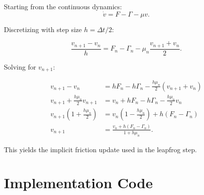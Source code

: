 \documentclass[12pt,letterpaper,twoside]{article}
\begin{document}
Starting from the continuous dynamics:
\[
\dot{v} = F - \Gamma - \mu v.
\]

Discretizing with step size $h = \Delta t / 2$:

\[
\frac{v_{n+1} - v_n}{h} = F_n - \Gamma_n - \mu_n \frac{v_{n+1} + v_n}{2}.
\]

Solving for $v_{n+1}$:

\begin{align}
v_{n+1} - v_n &= h F_n - h \Gamma_n - \frac{h \mu_n}{2} (v_{n+1} + v_n) \\
v_{n+1} + \frac{h \mu_n}{2} v_{n+1} &= v_n + h F_n - h \Gamma_n - \frac{h \mu_n}{2} v_n \\
v_{n+1} \left(1 + \frac{h \mu_n}{2}\right) &= v_n \left(1 - \frac{h \mu_n}{2}\right) + h(F_n - \Gamma_n) \\
v_{n+1} &= \frac{v_n + h(F_n - \Gamma_n)}{1 + h \mu_n}.
\end{align}

This yields the implicit friction update used in the leapfrog step.

\section{Implementation Code}
\end{document}
